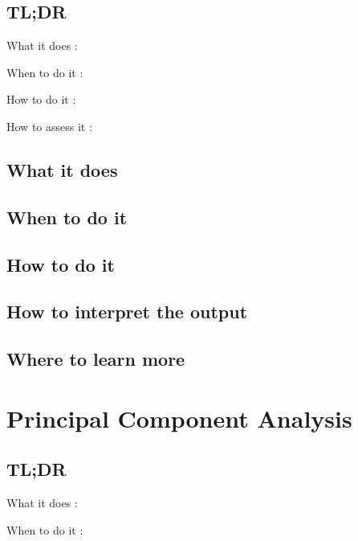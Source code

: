 \documentclass[
]{book}
\begin{document}
\hypertarget{tldr-20}{%
\section{TL;DR}\label{tldr-20}}

What it does
:

When to do it
:

How to do it
:

How to assess it
:

\hypertarget{what-it-does-20}{%
\section{What it does}\label{what-it-does-20}}

\hypertarget{when-to-do-it-20}{%
\section{When to do it}\label{when-to-do-it-20}}

\hypertarget{how-to-do-it-20}{%
\section{How to do it}\label{how-to-do-it-20}}

\hypertarget{how-to-interpret-the-output-20}{%
\section{How to interpret the output}\label{how-to-interpret-the-output-20}}

\hypertarget{where-to-learn-more-20}{%
\section{Where to learn more}\label{where-to-learn-more-20}}

\hypertarget{principal-component-analysis}{%
\chapter{Principal Component Analysis}\label{principal-component-analysis}}

\hypertarget{tldr-21}{%
\section{TL;DR}\label{tldr-21}}

What it does
:

When to do it
:
\end{document}
